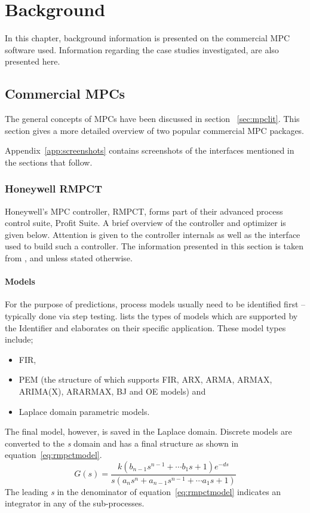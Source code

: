\chapter{Background}\label{chap:background}
\begin{overview}
  In this chapter, background information is presented on the commercial MPC software used. 
  Information regarding the case studies investigated, are also presented here.
\end{overview}

\section{Commercial MPCs}
The general concepts of MPCs have been discussed in section ~\ref{sec:mpclit}.
This section gives a more detailed overview of two popular commercial MPC packages.

Appendix~\ref{app:screenshots} contains screenshots of the interfaces mentioned in the sections that follow.

\subsection{Honeywell RMPCT}
Honeywell's MPC controller, RMPCT, forms part of their advanced process control suite, Profit Suite.
A brief overview of the controller and optimizer is given below. 
Attention is given to the controller internals as well as the interface used to build such a controller.
The information presented in this section is taken from \citet{honeywell1}, \citet{honeywell2} and \citet{honeywell3} unless stated otherwise.

\subsubsection{Models}
For the purpose of predictions, process models usually need to be identified first -- typically done via step testing.
\citet{honeywell3} lists the types of models which are supported by the Identifier and elaborates on their specific application.
These model types include;
\begin{itemize}
\item FIR,
\item PEM (the structure of which supports FIR, ARX, ARMA, ARMAX, ARIMA(X), ARARMAX, BJ and OE models) and
\item Laplace domain parametric models.
\end{itemize}
The final model, however, is saved in the Laplace domain.
Discrete models are converted to the {\it s} domain and has a final structure as shown in equation~\ref{eq:rmpctmodel}.
\begin{equation}
  \label{eq:rmpctmodel}
  G(s) = \frac{k(b_{n-1}s^{n-1}+ \cdots b_1s+1)e^{-ds}} {s(a_ns^n+a_{n-1}s^{n-1}+ \cdots a_1s+1)}
\end{equation}
The leading {\it s} in the denominator of equation~\ref{eq:rmpctmodel} indicates an integrator in any of the sub-processes.

